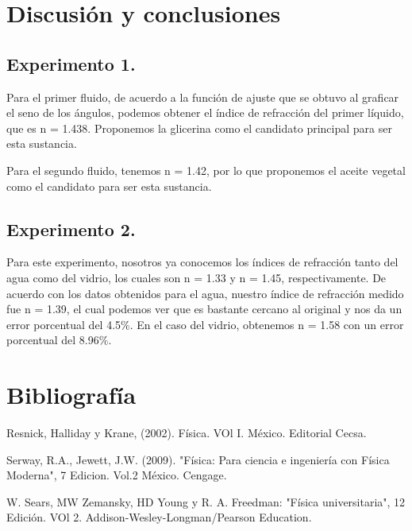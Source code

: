\documentclass[10pt,journal]{IEEEtran}
\begin{document}
\section{Discusión y conclusiones}

\subsection{Experimento 1.}
\item 

 Para el primer fluido, de acuerdo a la función de ajuste que se obtuvo al graficar el seno de los ángulos, podemos obtener el índice de refracción del primer líquido, que es n = 1.438. Proponemos la glicerina como el candidato principal para ser esta sustancia.

Para el segundo fluido, tenemos n = 1.42, por lo que proponemos el aceite vegetal como el candidato para ser esta sustancia.

\item 


\subsection{Experimento 2.}

Para este experimento, nosotros ya conocemos los índices de refracción tanto del agua como del vidrio, los cuales son n = 1.33 y n = 1.45, respectivamente. De acuerdo con los datos obtenidos para el agua, nuestro índice de refracción medido fue n = 1.39, el cual podemos ver que es bastante cercano al original y nos da un error porcentual del 4.5\%. En el caso del vidrio, obtenemos n = 1.58 con un error porcentual del 8.96\%.

\item 






\section{Bibliografía}


Resnick, Halliday y Krane, (2002). Física. VOl I. México. Editorial Cecsa.


Serway, R.A., Jewett, J.W. (2009). "Física: Para ciencia e ingeniería con Física Moderna", 7 Edicion. Vol.2 México. Cengage.


W. Sears, MW Zemansky, HD Young y R. A. Freedman: "Física universitaria", 12 Edición. VOl 2. Addison-Wesley-Longman/Pearson Education.
\end{document}
